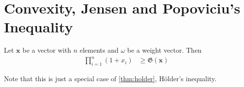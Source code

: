 \documentclass{subfile}
\begin{document}
	\section{Convexity, Jensen and Popoviciu's Inequality}\label{sec:convexity}
	
		\begin{theorem}
			Let $\mathbf{x}$ be a vector with $n$ elements and $\omega$ be a weight vector. Then
				\begin{align*}
					\prod_{i=1}^{n}(1+x_{i})
						& \geq \mathfrak{G}(\mathbf{x})
				\end{align*}
		\end{theorem}
	Note that this is just a special case of \autoref{thm:holder}, H\"{o}lder's inequality.
\end{document}
